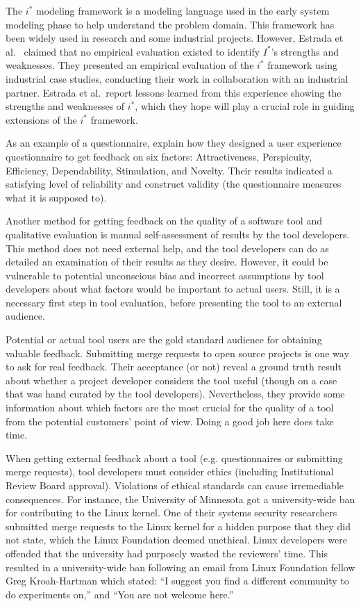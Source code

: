 The $i^*$ modeling framework is a modeling language used in the early
system modeling phase to help understand the problem domain. This
framework has been widely used in research and some industrial
projects. However, Estrada et
al.~\cite{estrada06:_empir_evaluat_framew_model_based} claimed that no
empirical evaluation existed to identify $I^*$'s strengths and
weaknesses. They presented an empirical evaluation of the $i^*$
framework using industrial case studies, conducting their work in
collaboration with an industrial partner. Estrada et al.~report
lessons learned from this experience showing the strengths and
weaknesses of $i^*$, which they hope will play a crucial role in
guiding extensions of the $i^*$ framework.

As an example of a questionnaire,  explain
how they designed a user experience questionnaire to get feedback on
six factors: Attractiveness, Perspicuity, Efficiency, Dependability,
Stimulation, and Novelty. Their results indicated a satisfying level
of reliability and construct validity (the questionnaire measures what
it is supposed to).

Another method for getting feedback on the quality of a software tool
and qualitative evaluation is manual self-assessment of results by the
tool developers. This method does not need external help, and the tool
developers can do as detailed an examination of their results as they
desire.  However, it could be vulnerable to potential unconscious bias
and incorrect assumptions by tool developers about what factors would be
important to actual users. Still, it is a necessary first step in tool
evaluation, before presenting the tool to an external audience.

Potential or actual tool users are the gold standard audience for
obtaining valuable feedback. Submitting merge requests to open source
projects is one way to ask for real feedback. Their acceptance (or
not) reveal a ground truth result about whether a project developer
considers the tool useful (though on a case that was hand curated by
the tool developers). Nevertheless, they provide some information
about which factors are the most crucial for the quality of a tool
from the potential customers' point of view. Doing a good job here
does take time.

When getting external feedback about a tool (e.g. questionnaires or
submitting merge requests), tool developers must consider ethics
(including Institutional Review Board approval). Violations of ethical
standards can cause irremediable consequences. For instance, the
University of Minnesota got a university-wide ban for contributing to
the Linux kernel. One of their systems security researchers submitted
merge requests to the Linux kernel for a hidden purpose that they did
not state, which the Linux Foundation deemed
unethical. Linux developers were offended that the university had purposely
wasted the reviewers' time. This resulted in a university-wide ban
following an email from Linux Foundation fellow Greg Kroah-Hartman
which stated: ``I suggest you find a different community to do
experiments on,'' and ``You are not welcome
here.''~\cite{minnesota_banned}


